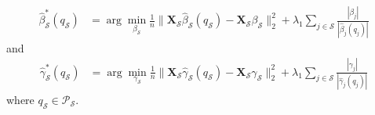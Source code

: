 \documentclass{amsart}
\newcommand{\x}{\boldsymbol{X}}
\begin{document}
\begin{align}
    \hat{\beta}^*_{\mathcal{S}}(q_{\mathcal{S}}) &= 
    \arg\min_{\beta_{\mathcal{S}}} \frac{1}{n}\|\x_{\mathcal{S}}\hat{\beta}_{\mathcal{S}}(q_{\mathcal{S}})
    - \x_{\mathcal{S}} \beta_{\mathcal{S}}\|_2^2 + \lambda_1\sum_{j\in\mathcal{S}} 
    \frac{|\beta_j|}{|\hat{\beta}_j(q_j)|}
\end{align}
and
\begin{align}
    \hat{\gamma}^*_{\mathcal{S}}(q_{\mathcal{S}}) &= 
    \arg\min_{\gamma_{\mathcal{S}}} \frac{1}{n}\|\x_{\mathcal{S}}\hat{\gamma}_{\mathcal{S}}(q_{\mathcal{S}})
    - \x_{\mathcal{S}} \gamma_{\mathcal{S}}\|_2^2 + \lambda_1\sum_{j\in\mathcal{S}} 
    \frac{|\gamma_j|}{|\hat{\gamma}_j(q_j)|}
\end{align}
where $q_{\mathcal{S}}\in \mathcal{P}_{\mathcal{S}}$.



\end{document}
